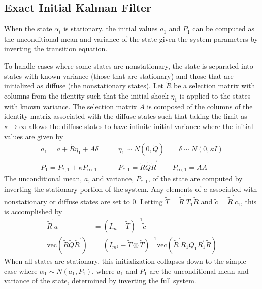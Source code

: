 \documentclass[12pt]{article}
\newcommand{\vecop}[0]{\text{vec}}
\begin{document}
\subsection*{Exact Initial Kalman Filter}
	When the state $\alpha_t$ is stationary, the initial values $a_1$ and $P_1$ can be computed as the unconditional mean and variance of the state given the system parameters by inverting the transition equation. 

	To handle cases where some states are nonstationary, the state is separated into states with known variance (those that are stationary) and those that are initialized as diffuse (the nonstationary states). Let $\tilde{R}$ be a selection matrix with columns from the identity such that the initial shock $\eta_1$ is applied to the states with known variance. The selection matrix $A$ is composed of the columns of the identity matrix associated with the diffuse states such that taking the limit as $\kappa \rightarrow \infty$ allows the diffuse states to have infinite initial variance where the initial values are given by 
	\begin{align*}
	a_1 = a + \tilde{R} \eta_1 + A \delta \qquad& \eta_1 \sim N(0, \tilde{Q}) \qquad \delta \sim N(0, \kappa I) \\
	P_1 = P_{*,1} + \kappa P_{\infty,1} \qquad& P_{*,1} = \tilde{R} \tilde{Q} \tilde{R}^\prime \qquad P_{\infty,1} = A A^\prime 
	\end{align*}
	The unconditional mean, $a$, and variance, $P_{*,1}$, of the state are computed by inverting the stationary portion of the system. Any elements of $a$ associated with nonstationary or diffuse states are set to 0. Letting $\tilde{T} = \tilde{R}^\prime T_1 \tilde{R}$ and $\tilde{c} = \tilde{R}^\prime c_1$, this is accomplished by
	\begin{align*}
	\tilde{R}^\prime a &= (I_m - \tilde{T})^{-1} \tilde{c} \\
	\vecop(\tilde{R} \tilde{Q} \tilde{R}^\prime) &= (I_{m^2} - \tilde{T} \otimes \tilde{T})^{-1} \vecop(\tilde{R}^\prime R_1 Q_1 R_1^\prime \tilde{R}) 
	\end{align*}
	When all states are stationary, this initialization collapses down to the simple case where $\alpha_1 \sim N(a_1, P_1)$, where $a_1$ and $P_1$ are the unconditional mean and variance of the state, determined by inverting the full system. 
\end{document}
